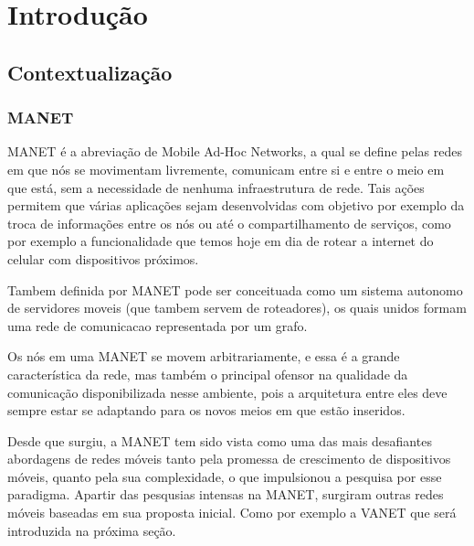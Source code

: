 \documentclass[12pt, %
openright, 
oneside,
a4paper,
brazil]{facom-ufu-abntex2}
\begin{document}
\tableofcontents*
\cleardoublepage





\textual



\chapter{Introdução}
\section{Contextualização}
\subsection{MANET}
MANET é a abreviação de Mobile Ad-Hoc Networks, a qual se define pelas redes em que nós se movimentam livremente, comunicam entre si e entre o meio em que está, sem a necessidade de nenhuma infraestrutura de rede. Tais ações permitem que várias aplicações sejam desenvolvidas com objetivo por exemplo da troca de informações entre os nós ou até o compartilhamento de serviços, como por exemplo a funcionalidade que temos hoje em dia de rotear a internet do celular com dispositivos próximos.


Tambem definida por MANET pode ser conceituada como um sistema autonomo de servidores moveis (que tambem servem de roteadores), os quais unidos formam uma rede de comunicacao representada por um grafo.

Os nós em uma MANET se movem arbitrariamente, e essa é a grande característica da rede, mas também o principal ofensor na qualidade da comunicação disponibilizada nesse ambiente, pois a arquitetura entre eles deve sempre estar se adaptando para os novos meios em que estão inseridos.

Desde que surgiu, a MANET tem sido vista como uma das mais desafiantes abordagens de redes móveis tanto pela promessa de crescimento de dispositivos móveis, quanto pela sua complexidade, o que impulsionou a pesquisa por esse paradigma. Apartir das pesqusias intensas na MANET, surgiram outras redes móveis baseadas em sua proposta inicial. Como por exemplo a VANET que será introduzida na próxima seção.
\end{document}

